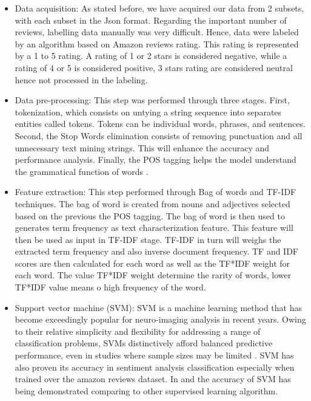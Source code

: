 \documentclass[preprint,3p,onecolumn]{elsarticle}
\begin{document}
\begin{itemize}
\item Data acquisition: As stated before, we have acquired our data from 2 subsets, with each subset in the Json format. Regarding the important number of reviews, labelling data manually was very difficult. Hence, data were labeled by an algorithm based on Amazon reviews rating. This rating is represented by a 1 to 5 rating. A rating of 1 or 2 stars is considered negative, while a rating of 4 or 5 is considered positive, 3 stars rating are considered neutral hence not processed in the labeling.

\item Data pre-processing: This step was performed through three stages. First, tokenization, which consists on untying a string sequence into separates entities called tokens. Tokens can be individual words, phrases, and sentences. Second, the Stop Words elimination consists of removing punctuation and all unnecessary text mining strings. This will enhance the accuracy and performance analysis. Finally, the POS tagging helps the model understand the grammatical function of words \citep{pasupa2019thai}.

\item Feature extraction: This step performed through Bag of words and TF-IDF techniques. The bag of word is created from nouns and adjectives selected based on the previous the POS tagging. The bag of word is then used to generates term frequency as text characterization feature. This feature will then be used as input in TF-IDF stage. TF-IDF in turn will weighs the extracted term frequency and also inverse document frequency. TF and IDF scores are then calculated for each word as well as the TF*IDF weight for each word. The value TF*IDF weight determine the rarity of words, lower TF*IDF value means o high frequency of the word. 

\item Support vector machine (SVM): SVM is a machine learning method that has become exceedingly popular for neuro-imaging analysis in recent years. Owing to their relative simplicity and flexibility for addressing a range of classification problems, SVMs distinctively afford balanced predictive performance, even in studies where sample sizes may be limited \citep{pisner2020support}. SVM has also proven its accuracy in sentiment analysis classification especially when trained over the amazon reviews dataset.  In \citep{nasr2017building} and  \citep{ haque2018sentiment} the accuracy of SVM has being demonstrated comparing to other supervised learning algorithm.
\end{itemize}
\end{document}
